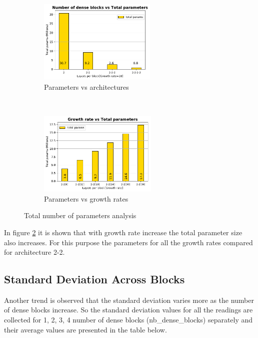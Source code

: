 \begin{figure}[ht]
  \centering
  \begin{subfigure}[b]{0.4\textwidth}
    \includegraphics[height=4cm]{images/densenet/siamese/densenet_siamese_blocks_params_bar}
    \caption{Parameters vs architectures}
    \label{fig:Denseblocks_vs_parameters}
  \end{subfigure}
  ~ %
  \begin{subfigure}[b]{0.4\textwidth}
    \includegraphics[height=4cm]{images/densenet/siamese/densenet_siamese_gr_params_bar}
    \caption{Parameters vs growth rates}
    \label{fig:growthrate_vs_parameters}
  \end{subfigure}  
  \caption{Total number of parameters analysis}
  \label{fig:total_parameters_densenet}
\end{figure}

In figure \ref{fig:growthrate_vs_parameters} it is shown that with growth rate increase the total parameter size also increases. For this purpose the parameters for all the growth rates compared for architecture 2-2.

\subsection{Standard Deviation Across Blocks}
Another trend is observed that the standard deviation varies more as the number of dense blocks increase. 
So the standard deviation values for all the readings are collected for 1, 2, 3, 4 number of dense blocks (nb\_dense\_blocks) separately and their average values are presented in the table below.


